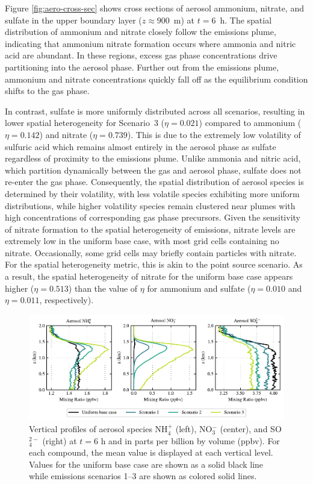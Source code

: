 \documentclass[journal abbreviation, manuscript]{copernicus}
\begin{document}
Figure \ref{fig:aero-cross-sec} shows cross sections of aerosol
ammonium, nitrate, and sulfate in the upper boundary layer
($z\approx900$~m) at $t=6$~h. The spatial distribution of ammonium and
nitrate closely follow the emissions plume, indicating that ammonium
nitrate formation occurs where ammonia and nitric acid are
abundant. In these regions, excess gas phase concentrations drive
partitioning into the aerosol phase. Further out from the emissions
plume, ammonium and nitrate concentrations quickly fall off as the
equilibrium condition shifts to the gas phase.

In contrast, sulfate is more uniformly distributed across all
scenarios, resulting in lower spatial heterogeneity for Scenario~3
($\eta=0.021$) compared to ammonium ($\eta = 0.142$) and nitrate
($\eta=0.739$).  This is due to the extremely low volatility of
sulfuric acid which remains almost entirely in the aerosol phase as
sulfate regardless of proximity to the emissions plume. Unlike ammonia
and nitric acid, which partition dynamically between the gas and
aerosol phase, sulfate does not re-enter the gas phase. Consequently,
the spatial distribution of aerosol species is determined by their
volatility, with less volatile species exhibiting more uniform
distributions, while higher volatility species remain clustered near
plumes with high concentrations of corresponding gas phase precursors.
Given the sensitivity of nitrate formation to the spatial
heterogeneity of emissions, nitrate levels are extremely low in the
uniform base case, with most grid cells containing no
nitrate. Occasionally, some grid cells may briefly contain particles
with nitrate. For the spatial heterogeneity metric, this is akin to
the point source scenario. As a result, the spatial heterogeneity of
nitrate for the uniform base case appears higher ($\eta=0.513$) than
the value of $\eta$ for ammonium and sulfate ($\eta=0.010$ and
$\eta=0.011$, respectively).

\begin{figure}[!h]
	\centering
	\includegraphics[]{figures/aerosol-SNA-vertical-profiles-time36.pdf}
	\caption{Vertical profiles of aerosol species NH$_4^+$ (left),
          NO$_3^-$ (center), and SO$_4^{2-}$ (right) at $t=6$ h and in
          parts per billion by volume (ppbv). For each compound, the
          mean value is displayed at each vertical level. Values for
          the uniform base case are shown as a solid black line while
          emissions scenarios 1--3 are shown as colored solid lines.}
	\label{fig:vertical-profile-SNA}
\end{figure} 
\end{document}

